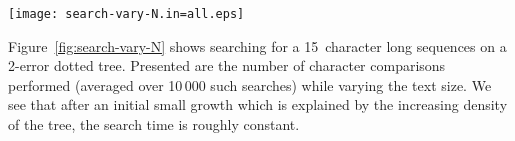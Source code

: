 \begin{figure*}
\centering
\texttt{[image: search-vary-N.in=all.eps]}
\caption{Search time versus text size}\label{fig:search-vary-N}
\end{figure*}


Figure~\ref{fig:search-vary-N} shows searching for a 15~character long sequences on a 2-error dotted tree. Presented are the number of character comparisons performed (averaged over 10\,000 such searches) while varying the text size. We see that after an initial small growth which is explained by the increasing density of the tree, the search time is roughly constant.
